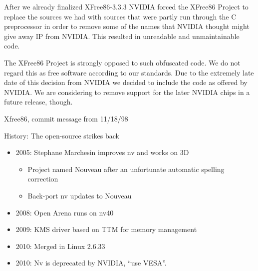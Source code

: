 \documentclass[11pt,english,compress]{beamer}
\begin{document}
		\begin{frame}
			\begin{block}{}
				After we already finalized XFree86-3.3.3 NVIDIA forced the XFree86 Project
				to replace the sources we had with sources that were partly run through the
				C preprocessor in order to remove some of the names that NVIDIA thought
				might give away IP from NVIDIA. This resulted in unreadable and unmaintainable
				code.
			\end{block}

			\begin{block}{}
				The XFree86 Project is strongly opposed to such obfuscated code. We do not
				regard this as free software according to our standards. Due to the extremely
				late date of this decision from NVIDIA we decided to include the code as
				offered by NVIDIA. We are considering to remove support for the later NVIDIA
				chips in a future release, though.
			\end{block}

			Xfree86, commit message from 11/18/98
		\end{frame}

		\begin{frame}
			\begin{block}{History: The open-source strikes back}
				\begin{itemize}
					\item 2005: Stephane Marchesin improves nv and works on 3D
					\begin{itemize}
						\item Project named Nouveau after an unfortunate automatic spelling correction
						\item Back-port nv updates to Nouveau
					\end{itemize}
					\item 2008: Open Arena runs on nv40
					\item 2009: KMS driver based on TTM for memory management
					\item 2010: Merged in Linux 2.6.33
					\item 2010: Nv is deprecated by NVIDIA, ``use VESA''.
				\end{itemize}
			\end{block}
		\end{frame}
\end{document}
